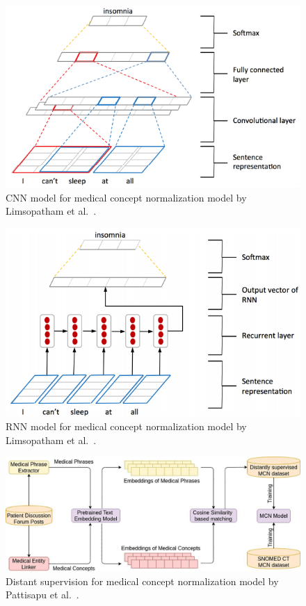 \begin{figure}[h]
	\centering
	\includegraphics[width=0.99\linewidth]{Figures/p.png}
	\caption{CNN model for medical concept normalization model by Limsopatham et al.~\cite{limsopatham2016normalising}.}
	\label{fig:cnn-medication-concept-normalization}
\end{figure}

\begin{figure}[h]
	\centering
	\includegraphics[width=0.99\linewidth]{Figures/q.png}
	\caption{RNN model for medical concept normalization model by Limsopatham et al.~\cite{limsopatham2016normalising}.}
	\label{fig:rnn-medication-concept-normalization}
\end{figure}

\begin{figure}[h]
	\centering
	\includegraphics[width=0.99\linewidth]{Figures/o.jpg}
	\caption{Distant supervision for medical concept normalization model by Pattisapu et al.~\cite{PATTISAPU2020103522}.}
	\label{fig:medication-concept-normalization}
\end{figure}

